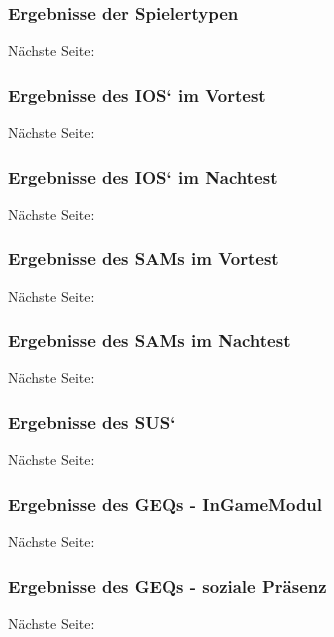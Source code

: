 \documentclass[
	12pt,
	a4paper,
	bibtotoc,
	cleardoubleempty, 
	idxtotoc,
	ngerman,
	openright
	final,
	listof=nochaptergap,
	]{scrbook}
\begin{document}
\begin{appendices}


\subsubsection{Ergebnisse der Spielertypen}
Nächste Seite:



\subsubsection{Ergebnisse des IOS` im Vortest}
Nächste Seite:


\subsubsection{Ergebnisse des IOS` im Nachtest}
Nächste Seite:


\subsubsection{Ergebnisse des SAMs im Vortest}
Nächste Seite:


\subsubsection{Ergebnisse des SAMs im Nachtest}
Nächste Seite:


\subsubsection{Ergebnisse des SUS` }
Nächste Seite:


\subsubsection{Ergebnisse des GEQs - InGameModul}
Nächste Seite:


\subsubsection{Ergebnisse des GEQs - soziale Präsenz}
Nächste Seite:



\end{appendices}
\end{document}
